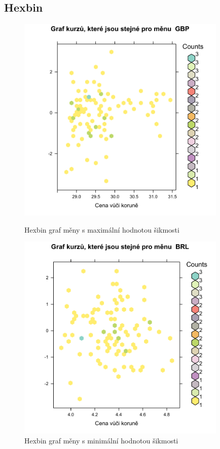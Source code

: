 \documentclass[a4paper]{ article}
\begin{document}
\subsection{Hexbin}
\begin{figure}[H]
\centering
\includegraphics[width=10cm]{hexbin_graf_max.pdf}
\caption{Hexbin graf měny s maximální hodnotou šikmosti}
\centering
\includegraphics[width=10cm]{hexbin_graf_min.pdf}
\caption{Hexbin graf měny s minimální hodnotou šikmosti}
\end{figure}
\end{document}
